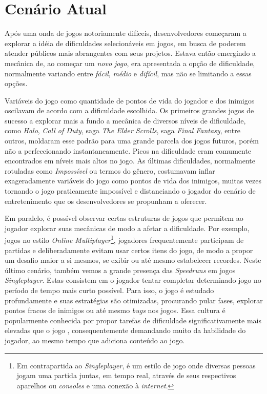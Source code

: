 \section{Cenário Atual}

Após uma onda de jogos notoriamente difíceis, desenvolvedores começaram a explorar a idéia de dificuldades selecionáveis em jogos, em busca de poderem atender públicos mais abrangentes com seus projetos. Estava então emergindo a mecânica de, ao começar um \textit{novo jogo}, era apresentada a opção de dificuldade, normalmente variando entre \textit{fácil}, \textit{médio} e \textit{difícil}, mas não se limitando a essas opções.

Variáveis do jogo como quantidade de pontos de vida do jogador e dos inimigos oscilavam de acordo com a dificuldade escolhida. Os primeiros grandes jogos de sucesso a explorar mais a fundo a mecânica de diversos níveis de dificuldade, como \textit{Halo}, \textit{Call of Duty}, saga \textit{The Elder Scrolls}, saga \textit{Final Fantasy}, entre outros, moldaram esse padrão para uma grande parcela dos jogos futuros, porém não a perfeccionando instantaneamente. Picos na dificuldade eram comumente encontrados em níveis mais altos no jogo. As últimas dificuldades, normalmente rotuladas como \textit{Impossível} ou termos do gênero, costumavam inflar exageradamente variáveis do jogo como pontos de vida dos inimigos, muitas vezes tornando o jogo praticamente impossível e distanciando o jogador do cenário de entretenimento que os desenvolvedores se propunham a oferecer.

Em paralelo, é possível observar certas estruturas de jogos que permitem ao jogador explorar suas mecânicas de modo a afetar a dificuldade. Por exemplo, jogos no estilo \textit{Online Multiplayer}\footnote{
    Em contrapartida ao \textit{Singleplayer}, é um estilo de jogo onde diversas pessoas jogam uma partida juntas, em tempo real, através de seus respectivos aparelhos ou \textit{consoles} e uma conexão à \textit{internet}.
}, jogadores frequentemente participam de partidas e deliberadamente evitam usar certos itens do jogo, de modo a propor um desafio maior a si mesmos, se exibir ou até mesmo estabelecer recordes. Neste último cenário, também vemos a grande presença das \textit{Speedruns} em jogos \textit{Singleplayer}. Estas consistem em o jogador tentar completar determinado jogo no período de tempo mais curto possível. Para isso, o jogo é estudado profundamente e suas estratégias são otimizadas, procurando pular fases, explorar pontos fracos de inimigos ou até mesmo \textit{bugs} nos jogos. Essa cultura é popularmente conhecida por propor tarefas de dificuldade significativamente mais elevadas que o jogo \textquotedbl{}, consequentemente demandando muito da habilidade do jogador, ao mesmo tempo que adiciona conteúdo ao jogo.

